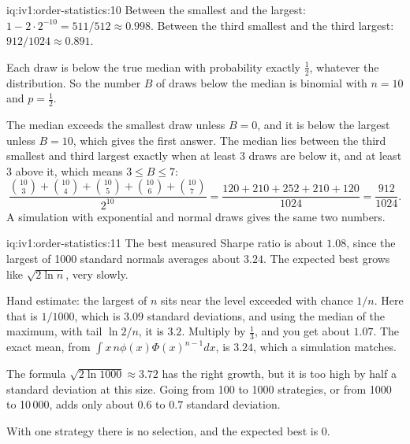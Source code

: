 \begin{solution}{iq:iv1:order-statistics:10}
Between the smallest and the largest: $1 - 2 \cdot 2^{-10} = 511/512 \approx 0.998$. Between the third smallest and the third largest: $912/1024 \approx 0.891$.

Each draw is below the true median with probability exactly $\tfrac12$, whatever the distribution. So the number $B$ of draws below the median is binomial with $n = 10$ and $p = \tfrac12$.

The median exceeds the smallest draw unless $B = 0$, and it is below the largest unless $B = 10$, which gives the first answer. The median lies between the third smallest and third largest exactly when at least 3 draws are below it, and at least 3 above it, which means $3 \le B \le 7$:
\[
\frac{\binom{10}{3} + \binom{10}{4} + \binom{10}{5} + \binom{10}{6} + \binom{10}{7}}{2^{10}} = \frac{120 + 210 + 252 + 210 + 120}{1024} = \frac{912}{1024}.
\]
A simulation with exponential and normal draws gives the same two numbers.

\end{solution}

\begin{solution}{iq:iv1:order-statistics:11}
The best measured Sharpe ratio is about $1.08$, since the largest of 1000 standard normals averages about $3.24$. The expected best grows like $\sqrt{2 \ln n}$, very slowly.

Hand estimate: the largest of $n$ sits near the level exceeded with chance $1/n$. Here that is $1/1000$, which is $3.09$ standard deviations, and using the median of the maximum, with tail $\ln 2/n$, it is $3.2$. Multiply by $\tfrac13$, and you get about $1.07$. The exact mean, from $\int x\, n\phi(x)\Phi(x)^{n - 1}dx$, is $3.24$, which a simulation matches.

The formula $\sqrt{2 \ln 1000} \approx 3.72$ has the right growth, but it is too high by half a standard deviation at this size. Going from 100 to 1000 strategies, or from 1000 to 10\,000, adds only about $0.6$ to $0.7$ standard deviation.

With one strategy there is no selection, and the expected best is 0.

\end{solution}

